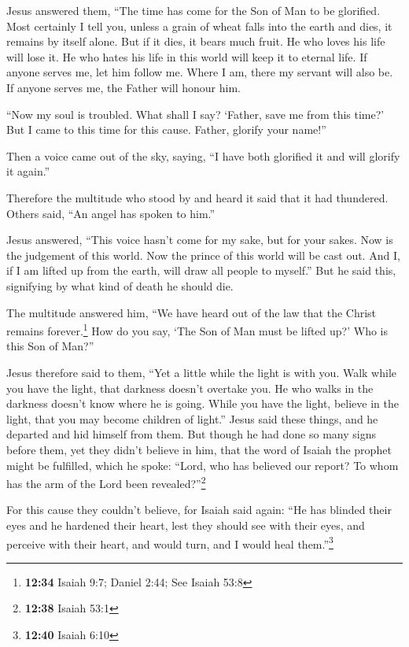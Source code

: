  Jesus answered them, ``The time has come for the Son of
Man to be glorified.  Most certainly I tell you, unless a
grain of wheat falls into the earth and dies, it remains by itself
alone. But if it dies, it bears much fruit.  He who loves
his life will lose it. He who hates his life in this world will keep it
to eternal life.  If anyone serves me, let him follow me.
Where I am, there my servant will also be. If anyone serves me, the
Father will honour him.

 ``Now my soul is troubled. What shall I say? `Father,
save me from this time?' But I came to this time for this cause.
 Father, glorify your name!''

Then a voice came out of the sky, saying, ``I have both glorified it and
will glorify it again.''

 Therefore the multitude who stood by and heard it said
that it had thundered. Others said, ``An angel has spoken to him.''

 Jesus answered, ``This voice hasn't come for my sake,
but for your sakes.  Now is the judgement of this world.
Now the prince of this world will be cast out.  And I, if
I am lifted up from the earth, will draw all people to myself.''
 But he said this, signifying by what kind of death he
should die.

 The multitude answered him, ``We have heard out of the
law that the Christ remains forever.\footnote{\textbf{12:34} Isaiah 9:7;
  Daniel 2:44; See Isaiah 53:8} How do you say, `The Son of Man must be
lifted up?' Who is this Son of Man?''

 Jesus therefore said to them, ``Yet a little while the
light is with you. Walk while you have the light, that darkness doesn't
overtake you. He who walks in the darkness doesn't know where he is
going.  While you have the light, believe in the light,
that you may become children of light.'' Jesus said these things, and he
departed and hid himself from them.  But though he had
done so many signs before them, yet they didn't believe in him,
 that the word of Isaiah the prophet might be fulfilled,
which he spoke: ``Lord, who has believed our report? To whom has the arm
of the Lord been revealed?''\footnote{\textbf{12:38} Isaiah 53:1}

 For this cause they couldn't believe, for Isaiah said
again:  ``He has blinded their eyes and he hardened their
heart, lest they should see with their eyes, and perceive with their
heart, and would turn, and I would heal them.''\footnote{\textbf{12:40}
  Isaiah 6:10}

